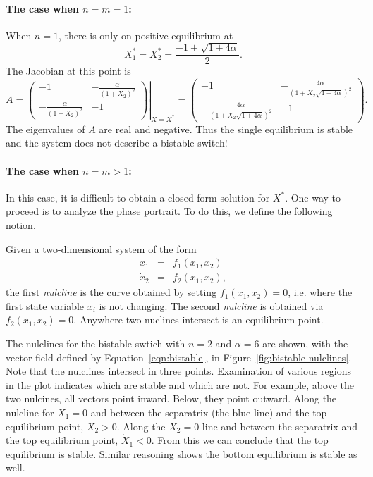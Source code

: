 \paragraph{The case when $n=m=1$:} When $n=1$, there is only on positive
equilibrium at
%
$$
X_1^* = X_2^* = \frac{-1 + \sqrt{1+4\alpha}}{2}.
$$
%
The Jacobian at this point is 
%
$$
A = \left . \left (
\begin{array}{cc}
-1 & -\frac{\alpha}{(1+X_2)^2} \\
-\frac{\alpha}{(1+X_2)^2} & -1 
\end{array}
\right ) \right |_{X=X^*}= 
\left (
\begin{array}{cc}
-1 & -\frac{4\alpha}{(1+X_2\sqrt{1+4\alpha})^2} \\
-\frac{4\alpha}{(1+X_2\sqrt{1+4\alpha})^2} & -1 
\end{array}
\right ) .
$$
%
The eigenvalues of $A$ are real and negative. Thus the single
equilibrium is stable and the system does not describe a bistable switch!

\paragraph{The case when $n=m>1$:} In this case, it is difficult to
obtain a closed form solution for $X^*$. One way to proceed is to
analyze the phase portrait. To do this, we define the following notion.

\begin{definition}
Given a two-dimensional system of the form 
\begin{eqnarray*}
\dot x_1 & = & f_1(x_1,x_2) \\
\dot x_2 & = & f_2(x_1,x_2),
\end{eqnarray*}
the first {\em nulcline} is the curve obtained by setting
$f_1(x_1,x_2) = 0$, i.e. where the first state variable $x_i$ is not
changing. The second {\em nulcline} is obtained via
$f_2(x_1,x_2)=0$. Anywhere two nuclines intersect is an equilibrium
point.
\end{definition}

The nulclines for the bistable swtich with $n=2$ and $\alpha=6$ are
shown, with the vector field defined by Equation~\ref{eqn:bistable},
in Figure~\ref{fig:bistable-nulclines}. Note that the nulclines
intersect in three points. Examination of various regions in the plot
indicates which are stable and which are not. For example, above the
two nulcines, all vectors point inward. Below, they point
outward. Along the nulcline for $\dot X_1 = 0$ and between the
separatrix (the blue line) and the top equilibrium point, $\dot X_2 >
0$. Along the $\dot X_2=0$ line and between the separatrix and the top
equilibrium point, $\dot X_1<0$. From this we can conclude that the
top equilibrium is stable. Similar reasoning shows the bottom
equilibrium is stable as well. 

